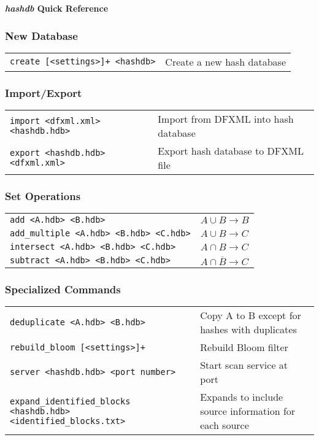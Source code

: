 \documentclass[12pt]{article}
\newcommand{\hdb}{\emph{hashdb}\xspace}
\begin{document}
\begin{center}
\textbf{\Large \hdb Quick Reference}
\end{center}


\subsubsection*{New Database}
\begin{tabular}{p{8 cm} p{9 cm} }
\texttt{create [<settings>]+ <hashdb>} & Create a new hash database \\
\end{tabular}

\subsubsection*{Import/Export}
\begin{tabular}{p{8 cm} p{9 cm} }
\texttt{import <dfxml.xml> <hashdb.hdb>} & Import from DFXML into hash database \\
\texttt{export <hashdb.hdb> <dfxml.xml>} & Export hash database to DFXML file \\
\end{tabular}

\subsubsection*{Set Operations}
\begin{tabular}{p{8 cm} p{9 cm} }
\texttt{add <A.hdb> <B.hdb>} & $A \cup B \rightarrow B$ \\
\texttt{add\_multiple <A.hdb> <B.hdb> <C.hdb>} & $A \cup B \rightarrow C$ \\
\texttt{intersect <A.hdb> <B.hdb> <C.hdb>} & $A \cap B \rightarrow C$ \\
\texttt{subtract <A.hdb> <B.hdb> <C.hdb>} & $A \cap \overline B \rightarrow C$ \\
\end{tabular}

\subsubsection*{Specialized Commands}
\begin{tabular}{p{8 cm} p{9 cm} }
\texttt{deduplicate <A.hdb> <B.hdb>} & Copy A to B except for hashes with duplicates \\
\texttt{rebuild\_bloom [<settings>]+} & Rebuild Bloom filter \\
\texttt{server <hashdb.hdb> <port number>} & Start scan service at port \\
\texttt{expand\_identified\_blocks <hashdb.hdb> <identified\_blocks.txt>} & Expands to include source information for each source \\
\end{tabular}
\end{document}
